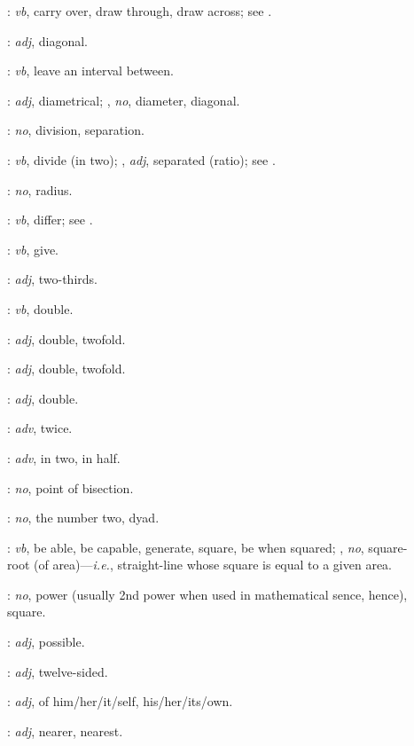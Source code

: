 {\begin{description}
\item[]: {\em vb}, carry over, draw through, draw across; see .
\item[]: {\em adj}, diagonal.
\item[]: {\em vb}, leave an interval between.
\item[]: {\em adj}, diametrical; , {\em no}, diameter, diagonal.
\item[]: {\em no}, division, separation.
\item[]: {\em vb}, divide (in two); , {\em adj}, separated (ratio); see .
\item[]: {\em no}, radius.
\item[]: {\em vb}, differ; see .
\item[]:
{\em vb}, give.
\item[]: {\em adj}, two-thirds.
\item[]: {\em vb}, double.
\item[]: {\em adj}, double, twofold.
\item[]: {\em adj}, double, twofold.
\item[]: {\em adj}, double.
\item[]: {\em adv}, twice.
\item[]: {\em adv}, in two, in half.
\item[]: {\em no}, point of bisection.
\item[]: {\em no}, the number two, dyad.
\item[]: {\em vb}, be able, be capable, generate, square, be when squared; , {\em no}, 
square-root (of area)---{\em i.e.}, strai\-ght-line whose square is equal to a given area.
\item[]: {\em no}, power (usually 2nd power when used in mathematical sence, hence), square.
\item[]: {\em adj}, possible.
\item[]: {\em adj}, twelve-sided.
\item[]: {\em adj}, of him/her/it/self, his/her/its/own.
\item[]: {\em adj}, nearer, nearest.

\end{description}}
